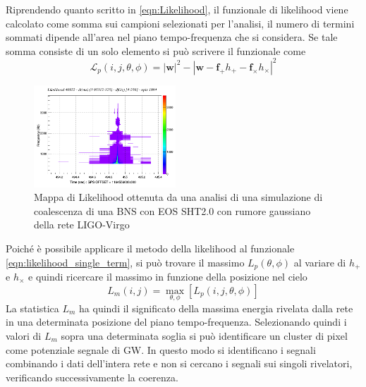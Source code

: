 Riprendendo quanto scritto in \ref{eqn:Likelihood}, il funzionale di likelihood viene calcolato come somma sui campioni selezionati per l'analisi, il numero di termini sommati dipende all'area nel piano tempo-frequenza che si considera. Se tale somma consiste di un solo elemento si può scrivere il funzionale come
\begin{equation}
	\mathcal{L}_p(i,j,\theta,\phi)=|\mathbf{w}|^2 -|\mathbf{w} - \mathbf{f}_+h_+ - \mathbf{f}_\times h_\times|^2
	\label{eqn:likelihood_single_term}
\end{equation}

\begin{figure}
	\vspace{-25pt}
	\begin{center}
		\includegraphics[width=0.475\textwidth]{figures/Capitolo_3/l_tfmap_scalogram.png}
	\end{center}
	\vspace{-5pt}
	\caption{Mappa di Likelihood ottenuta da una analisi di una simulazione di coalescenza di una BNS con EOS SHT2.0 con rumore gaussiano della rete LIGO-Virgo}
	\label{fig:Likelihood_example}
	\vspace{-10pt}
\end{figure}
Poiché è possibile applicare il metodo della likelihood al funzionale \ref{eqn:likelihood_single_term}, si può trovare il massimo $L_p(\theta, \phi)$ al variare di $h_+$ e $h_\times$ e quindi ricercare il massimo in funzione della posizione nel cielo
\begin{equation}
	L_m(i,j)= \max_{\theta, \phi}[L_p(i,j,\theta,\phi)]
	\label{eqn:max_L}
\end{equation}
La statistica $L_m$ ha quindi il significato della massima energia rivelata dalla rete in una determinata posizione del piano tempo-frequenza. Selezionando quindi i valori di $L_m$ sopra una determinata soglia si può identificare un cluster di pixel come potenziale segnale di GW. In questo modo si identificano i segnali combinando i dati dell'intera rete e non si cercano i segnali sui singoli rivelatori, verificando successivamente la coerenza.
